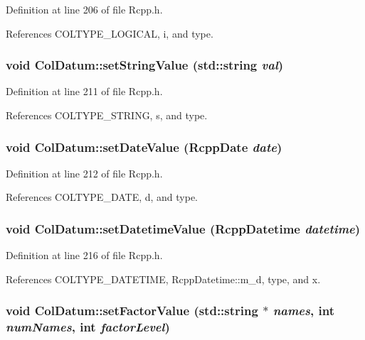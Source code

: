 Definition at line 206 of file Rcpp.h.

References COLTYPE\_\-LOGICAL, i, and type.\hypertarget{classColDatum_a87060ae6c415167d501c41684d8a586}{
\subsubsection[setStringValue]{\setlength{\rightskip}{0pt plus 5cm}void ColDatum::setStringValue (std::string {\em val})}}
\label{classColDatum_a87060ae6c415167d501c41684d8a586}




Definition at line 211 of file Rcpp.h.

References COLTYPE\_\-STRING, s, and type.\hypertarget{classColDatum_988defa165f1d5ab7cde96d2c86c7c69}{
\subsubsection[setDateValue]{\setlength{\rightskip}{0pt plus 5cm}void ColDatum::setDateValue ({\bf RcppDate} {\em date})}}
\label{classColDatum_988defa165f1d5ab7cde96d2c86c7c69}




Definition at line 212 of file Rcpp.h.

References COLTYPE\_\-DATE, d, and type.\hypertarget{classColDatum_5803eb7a89dc467b88d7d412462c6fb5}{
\subsubsection[setDatetimeValue]{\setlength{\rightskip}{0pt plus 5cm}void ColDatum::setDatetimeValue ({\bf RcppDatetime} {\em datetime})}}
\label{classColDatum_5803eb7a89dc467b88d7d412462c6fb5}




Definition at line 216 of file Rcpp.h.

References COLTYPE\_\-DATETIME, RcppDatetime::m\_\-d, type, and x.\hypertarget{classColDatum_bd6f582044692c2215d9cd4add379ea1}{
\subsubsection[setFactorValue]{\setlength{\rightskip}{0pt plus 5cm}void ColDatum::setFactorValue (std::string $\ast$ {\em names}, \/  int {\em numNames}, \/  int {\em factorLevel})}}
\label{classColDatum_bd6f582044692c2215d9cd4add379ea1}




